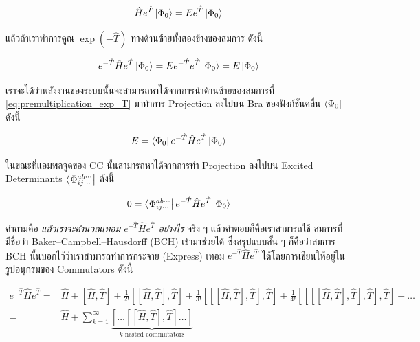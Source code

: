 \begin{equation}
  \hat{H} e^{\hat{T}} \ket{\Phi_0}
  =
  E e^{\hat{T}} \ket{\Phi_0}
\end{equation}

\noindent แล้วถ้าเราทำการคูณ $\exp(-\hat{T})$ ทางด้านซ้ายทั้งสองข้างของสมการ ดังนี้

\begin{equation}
  \label{eq:premultiplication_exp_T}
  e^{-\hat{T}} \hat{H} e^{\hat{T}} \ket{\Phi_0}
  = E e^{-\hat{T}}e^{\hat{T}} \ket{\Phi_0}
  = E \ket{\Phi_0}
\end{equation}

\noindent เราจะได้ว่าพลังงานของระบบนั้นจะสามารถหาได้จากการนำด้านซ้ายของสมการที่ \eqref{eq:premultiplication_exp_T} มาทำการ
Projection ลงไปบน Bra ของฟังก์ชันคลื่น $\bra{\Phi_0}$ ดังนี้

\begin{equation}
  E = \bra{\Phi_0} e^{-\hat{T}} \hat{H} e^{\hat{T}}\ket{\Phi_0}
\end{equation}

\noindent ในขณะที่แอมพลจูดของ CC นั้นสามารถหาได้จากการทำ Projection ลงไปบน Excited Determinants
$\bra{\Phi_{ij\cdots}^{ab\cdots}}$ ดังนี้

\begin{equation}
  0
  =
  \bra{\Phi_{ij\cdots}^{ab\cdots}} e^{-\hat{T}} \hat{H} e^{\hat{T}}\ket{\Phi_0}
\end{equation}

คำถามคือ \textit{แล้วเราจะคำนวณเทอม $e^{-\hat{T}} \hat{H} e^{\hat{T}}$ อย่างไร} จริง ๆ แล้วคำตอบก็คือเราสามารถใช้%
สมการที่มีชื่อว่า Baker--Campbell--Hausdorff (BCH) เข้ามาช่วยได้ ซึ่งสรุปแบบสั้น ๆ ก็คือว่าสมการ BCH นั้นบอกไว้ว่าเราสามารถทำการกระจาย
(Express) เทอม $e^{-\hat{T}} \hat{H} e^{\hat{T}}$ ได้โดยการเขียนให้อยู่ในรูปอนุกรมของ Commutators ดังนี้

\begin{equation}
  \begin{split}
    e^{-\hat{T}} \hat{H} e^{\hat{T}}
    =&
    \hat{H} + [\hat{H},\hat{T}] + \frac{1}{2!} [[\hat{H},\hat{T}],\hat{T}] +
    \frac{1}{3!} [[[\hat{H},\hat{T}],\hat{T}],\hat{T}] +
    \frac{1}{4!} [[[[\hat{H},\hat{T}],\hat{T}],\hat{T}],\hat{T}]  + \ldots \\
    =&
    \hat{H} + \sum_{k=1}^\infty \underbrace{
      [\ldots[[\hat{H},\hat{T}],\hat{T}] \ldots ]
    }_{
      k\text{ nested commutators}
    }
  \end{split}
\end{equation}

